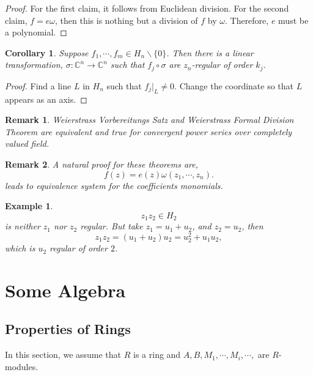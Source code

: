 \documentclass{article}
\newtheorem{remark}{Remark}[section]
\newtheorem{corollary}{Corollary} [section]
\newtheorem{example}{Example}[section]
\newcommand{\C}[0]{\mathbb{C}}
\begin{document}
\begin{proof}
  For the first claim, it follows from Euclidean division. For the second claim, $f = e\omega$, then this is nothing but a division of $f$ by $\omega$. Therefore, $e$ must be a polynomial.
\end{proof}
\begin{corollary}
  Suppose $f_1,\cdots,f_m\in H_n\backslash\{0\}$. Then there is a linear transformation, $\sigma:\C^n\to \C^n$ such that 
  $f_j\circ \sigma$ are $z_n$-regular of order $k_j$.
\end{corollary}
\begin{proof}
  Find a line $L$ in $H_n$ such that $f_j|_L \not=0$. Change the coordinate so that $L$ appears as an axis.
\end{proof} 
\begin{remark}
  Weierstrass Vorbereitungs Satz and Weierstrass Formal Division Theorem are equivalent and true for convergent power series over completely valued field.%
\end{remark}
\begin{remark}
  A natural proof for these theorems are,
  \begin{equation*}
    f(z) = e(z)\omega(z_1,\cdots,z_n).
  \end{equation*} 
  leads to equivalence system for the coefficients monomials.
\end{remark}
\begin{example}
  \begin{equation*}
    z_1z_2\in H_2
  \end{equation*}
  is neither $z_1$ nor $z_2$ regular. But take $z_1 = u_1+u_2$, and $z_2 = u_2$, then
  \begin{equation*}
    z_1z_2 = (u_1+u_2)u_2 = u_2^2  + u_1u_2,
  \end{equation*}
  which is $u_2$ regular of order $2$.
\end{example}

\section{Some Algebra}

\subsection{Properties of Rings}

In this section, we assume that $R$ is a ring and $A,B,M_1,\cdots,M_i,\cdots,$ are $R$-modules.
\end{document}
